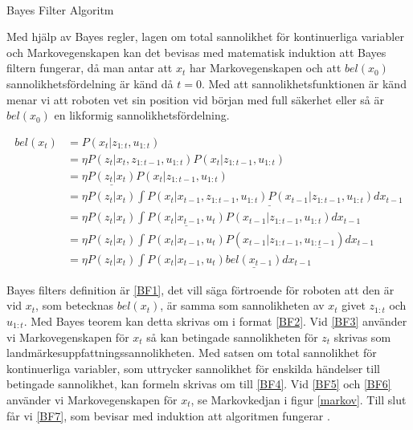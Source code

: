 \begin{algorithm}[H]
    \SetAlgoLined
    \label{BFA}
     \\
    \caption{Bayes Filter Algoritm}
\end{algorithm}

Med hjälp av Bayes regler, lagen om total sannolikhet för kontinuerliga variabler och Markovegenskapen kan det bevisas med matematisk induktion att Bayes filtern fungerar, då man antar att $x_t$ har Markovegenskapen och att $bel(x_0)$ sannolikhetsfördelning är känd då $t = 0$. Med att sannolikhetsfunktionen är känd menar vi att roboten vet sin position vid början med full säkerhet eller så är $bel(x_0)$ en likformig sannolikhetsfördelning.

\begin{align}
bel(x_t) & = P(x_t | z_{1:t}, u_{1:t}) \tag{BF1}\label{BF1} \\
        & = \eta P(z_t | x_t, z_{1:t-1}, u_{1:t}) P(x_t | z_{1:t-1}, u_{1:t}) \tag{BF2}\label{BF2}\\
        & = \eta \underline{P(z_t | x_t)} P(x_t | z_{1:t-1}, u_{1:t}) \tag{BF3}\label{BF3}\\
        & = \eta P(z_t | x_t) \underline{\int P(x_t | x_{t-1}, z_{1:t-1}, u_{1:t}) P(x_{t-1} | z_{1:t-1}, u_{1:t}) dx_{t-1}} \tag{BF4}\label{BF4}\\
        & = \eta P(z_t | x_t) \int \underline{P(x_t | x_{t-1}, u_t)} P(x_{t-1} | z_{1:t-1}, u_{1:t}) dx_{t-1} \tag{BF5}\label{BF5}\\
        & = \eta P(z_t | x_t) \int P(x_t | x_{t-1}, u_t) P(x_{t-1} | z_{1:t-1}, \underline{u_{1:t-1}}) dx_{t-1} \tag{BF6}\label{BF6}\\
        & = \eta P(z_t | x_t) \int P(x_t | x_{t-1}, u_t) \underline{bel(x_{t-1})} dx_{t-1} \tag{BF7}\label{BF7}
\end{align}

Bayes filters definition är \ref{BF1}, det vill säga förtroende för roboten att den är vid $x_t$, som betecknas $bel(x_t)$, är samma som sannolikheten av $x_t$ givet $z_{1:t}$ och $u_{1:t}$. Med Bayes teorem kan detta skrivas om i format \ref{BF2}. Vid \ref{BF3} använder vi Markovegenskapen för $x_t$ så kan betingade sannolikheten för $z_t$ skrivas som landmärkesuppfattningssannolikheten. Med satsen om total sannolikhet för kontinuerliga variabler, som uttrycker sannolikhet för enskilda händelser till betingade sannolikhet, kan formeln skrivas om till \ref{BF4}. Vid \ref{BF5} och \ref{BF6} använder vi Markovegenskapen för $x_t$, se Markovkedjan i figur \ref{markov}. Till slut får vi \ref{BF7}, som bevisar med induktion att algoritmen fungerar \citep{ProbabilisticRobotics}.

